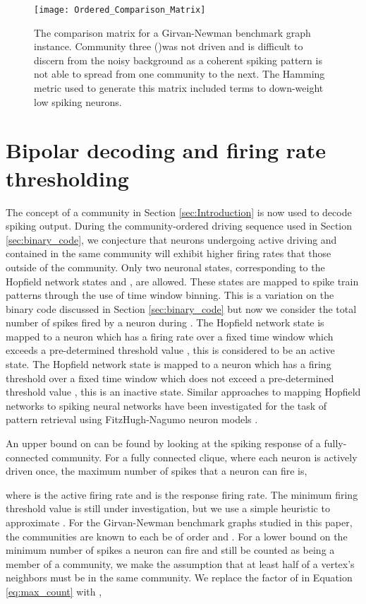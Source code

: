 \documentclass[sigconf]{acmart}
\begin{document}
\begin{figure}
\texttt{[image: Ordered\_Comparison\_Matrix]}
\caption{The comparison matrix for a Girvan-Newman benchmark graph instance. Community three ()was not driven and is difficult to discern from the noisy background as a coherent spiking pattern is not able to spread from one community to the next. The Hamming metric used to generate this matrix included terms to down-weight low spiking neurons.}
\label{fig:comparison_matrix}
\end{figure}
\section{Bipolar decoding and firing rate thresholding} 
\label{sec:bipolar_code}
The concept of a community in Section \ref{sec:Introduction} is now used to decode spiking output. During the community-ordered driving sequence used in Section \ref{sec:binary_code}, we conjecture that neurons undergoing active driving and contained in the same community will exhibit higher firing rates that those outside of the community. Only two neuronal states, corresponding to the Hopfield network states  and , are allowed. These states are mapped to spike train patterns through the use of time window binning. This is a variation on the binary code discussed in Section \ref{sec:binary_code} but now we consider the total number of spikes fired by a neuron during . The Hopfield network state  is mapped to a neuron which has a firing rate over a fixed time window  which exceeds a pre-determined threshold value , this is considered to be an active state. The Hopfield network state  is mapped to a neuron which has a firing threshold over a fixed time window  which does not exceed a pre-determined threshold value , this is an inactive state. Similar approaches to mapping Hopfield networks to spiking neural networks have been investigated for the task of pattern retrieval using FitzHugh-Nagumo neuron models \cite{kanamaru2001fluctuation,kanamaru2000associative}. 

An upper bound on  can be found by looking at the spiking response of a fully-connected  community. For a fully connected clique, where each neuron is actively driven once, the maximum number of spikes that a neuron can fire is,

where  is the active firing rate and  is the response firing rate. The minimum firing threshold value is still under investigation, but we use a simple heuristic to approximate . For the Girvan-Newman benchmark graphs studied in this paper, the communities are known to each be of order  and . For a lower bound on the minimum number of spikes a neuron can fire and still be counted as being a member of a community, we make the assumption that at least half of a vertex's neighbors must be in the same community. We replace the factor of  in Equation \eqref{eq:max_count} with ,
\end{document}
